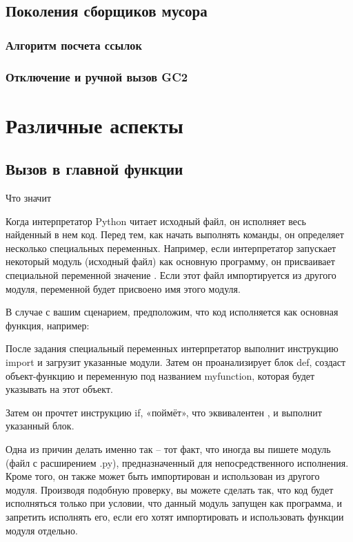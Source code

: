 \section{Поколения сборщиков мусора}

\subsection{Алгоритм посчета ссылок}

\subsection{Отключение и ручной вызов GC2}

\chapter{Различные аспекты}

\section{Вызов в главной функции}
Что значит 

Когда интерпретатор Python читает исходный файл, он исполняет весь найденный в нем код. Перед тем, как начать выполнять команды, он определяет несколько специальных переменных. Например, если интерпретатор запускает некоторый модуль (исходный файл) как основную программу, он присваивает специальной переменной  значение . Если этот файл импортируется из другого модуля, переменной  будет присвоено имя этого модуля.

В случае с вашим сценарием, предположим, что код исполняется как основная функция, например:


После задания специальный переменных интерпретатор выполнит инструкцию import и загрузит указанные модули. Затем он проанализирует блок def, создаст объект-функцию и переменную под названием myfunction, которая будет указывать на этот объект.

Затем он прочтет инструкцию if, «поймёт», что  эквивалентен , и выполнит указанный блок.

Одна из причин делать именно так – тот факт, что иногда вы пишете модуль (файл с расширением .py), предназначенный для непосредственного исполнения. Кроме того, он также может быть импортирован и использован из другого модуля. Производя подобную проверку, вы можете сделать так, что код будет исполняться только при условии, что данный модуль запущен как программа, и запретить исполнять его, если его хотят импортировать и использовать функции модуля отдельно.


